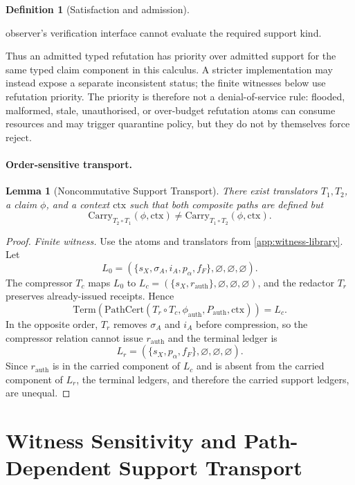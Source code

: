 \documentclass[11pt,twoside]{article}
\newtheorem{lemma}[theorem]{Lemma}
\theoremstyle{definition}
\newtheorem{definition}[theorem]{Definition}
\newcommand{\Carry}{\mathrm{Carry}}
\newcommand{\PathCert}{\mathrm{PathCert}}
\newcommand{\Term}{\mathrm{Term}}
\newcommand{\ctx}{\mathrm{ctx}}
\begin{document}
\begin{definition}[Satisfaction and admission]
\begin{enumerate}[leftmargin=*]
        observer's verification interface cannot evaluate the required support
        kind.
\end{enumerate}
Thus an admitted typed refutation has priority over admitted support for the
same typed claim component in this calculus. A stricter implementation
may instead expose a separate inconsistent status; the finite witnesses below
use refutation priority. The priority is therefore not a denial-of-service rule:
flooded, malformed, stale, unauthorised, or over-budget refutation atoms can
consume resources and may trigger quarantine policy, but they do not by
themselves force $\mathrm{reject}$.
\end{definition}

\paragraph{Order-sensitive transport.}
\begin{lemma}[Noncommutative Support Transport]
\label{lem:noncommutative-support-transport}
There exist translators $T_1,T_2$, a claim $\phi$, and a context $\ctx$ such
that both composite paths are defined but
\[
  \Carry_{T_2\circ T_1}(\phi,\ctx)
  \neq
  \Carry_{T_1\circ T_2}(\phi,\ctx).
\]
\end{lemma}

\begin{proof}
\textit{Finite witness.}
Use the atoms and translators from \cref{app:witness-library}. Let
\[
  L_0=(\{s_X,\sigma_A,i_A,p_\alpha,f_F\},\varnothing,\varnothing,\varnothing).
\]
The compressor $T_c$ maps $L_0$ to
$L_c=(\{s_X,r_{\mathrm{auth}}\},\varnothing,\varnothing,\varnothing)$, and the
redactor $T_r$ preserves already-issued receipts. Hence
\[
  \Term(\PathCert(T_r\circ T_c,\phi_{\mathrm{auth}},P_{\mathrm{auth}},\ctx))
  =
  L_c.
\]
In the opposite order, $T_r$ removes $\sigma_A$ and $i_A$ before compression,
so the compressor relation cannot issue $r_{\mathrm{auth}}$ and the terminal
ledger is
\[
  L_r=(\{s_X,p_\alpha,f_F\},\varnothing,\varnothing,\varnothing).
\]
Since $r_{\mathrm{auth}}$ is in the carried component of $L_c$ and is absent
from the carried component of $L_r$, the terminal ledgers, and therefore the
carried support ledgers, are unequal.
\end{proof}

\section{Witness Sensitivity and Path-Dependent Support Transport}
\label{sec:path-dependent}
\end{document}
